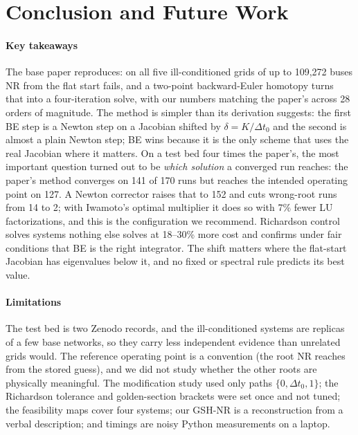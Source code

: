 \documentclass[sigconf,nonacm]{acmart}
\begin{document}
\clearpage
\section{Conclusion and Future Work}\label{sec:conclusion}
\paragraph{Key takeaways} The base paper reproduces: on all five ill-conditioned grids of up to 109{,}272
buses NR from the flat start fails, and a two-point backward-Euler homotopy turns that into a
four-iteration solve, with our numbers matching the paper's across 28 orders of magnitude. The method is
simpler than its derivation suggests: the first BE step is a Newton step on a Jacobian shifted by
$\delta=K/\Delta t_0$ and the second is almost a plain Newton step; BE wins because it is the only scheme
that uses the real Jacobian where it matters. On a test bed four times the paper's, the most important
question turned out to be \emph{which solution} a converged run reaches: the paper's method converges on 141
of 170 runs but reaches the intended operating point on 127. A Newton corrector raises that to 152 and cuts
wrong-root runs from 14 to 2; with Iwamoto's optimal multiplier it does so with 7\% fewer LU factorizations,
and this is the configuration we recommend. Richardson control solves systems nothing else solves at 18--30\%
more cost and confirms under fair conditions that BE is the right integrator. The shift matters where the
flat-start Jacobian has eigenvalues below it, and no fixed or spectral rule predicts its best value.

\paragraph{Limitations} The test bed is two Zenodo records, and the ill-conditioned systems are replicas of a
few base networks, so they carry less independent evidence than unrelated grids would. The reference
operating point is a convention (the root NR reaches from the stored guess), and we did not study whether the
other roots are physically meaningful. The modification study used only paths $\{0,\Delta t_0,1\}$; the
Richardson tolerance and golden-section brackets were set once and not tuned; the feasibility maps cover four
systems; our GSH-NR is a reconstruction from a verbal description; and timings are noisy Python measurements on
a laptop.
\end{document}
